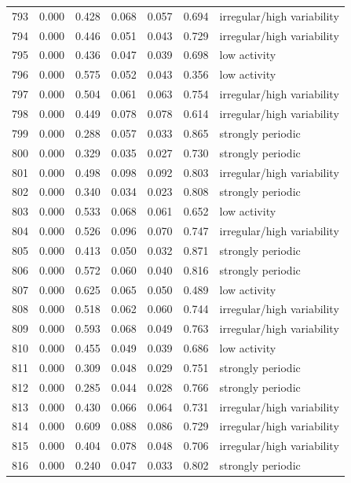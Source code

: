 \begin{longtable}{lrrrrrl}
793 & 0.000 & 0.428 & 0.068 & 0.057 & 0.694 & irregular/high variability \\
794 & 0.000 & 0.446 & 0.051 & 0.043 & 0.729 & irregular/high variability \\
795 & 0.000 & 0.436 & 0.047 & 0.039 & 0.698 & low activity \\
796 & 0.000 & 0.575 & 0.052 & 0.043 & 0.356 & low activity \\
797 & 0.000 & 0.504 & 0.061 & 0.063 & 0.754 & irregular/high variability \\
798 & 0.000 & 0.449 & 0.078 & 0.078 & 0.614 & irregular/high variability \\
799 & 0.000 & 0.288 & 0.057 & 0.033 & 0.865 & strongly periodic \\
800 & 0.000 & 0.329 & 0.035 & 0.027 & 0.730 & strongly periodic \\
801 & 0.000 & 0.498 & 0.098 & 0.092 & 0.803 & irregular/high variability \\
802 & 0.000 & 0.340 & 0.034 & 0.023 & 0.808 & strongly periodic \\
803 & 0.000 & 0.533 & 0.068 & 0.061 & 0.652 & low activity \\
804 & 0.000 & 0.526 & 0.096 & 0.070 & 0.747 & irregular/high variability \\
805 & 0.000 & 0.413 & 0.050 & 0.032 & 0.871 & strongly periodic \\
806 & 0.000 & 0.572 & 0.060 & 0.040 & 0.816 & strongly periodic \\
807 & 0.000 & 0.625 & 0.065 & 0.050 & 0.489 & low activity \\
808 & 0.000 & 0.518 & 0.062 & 0.060 & 0.744 & irregular/high variability \\
809 & 0.000 & 0.593 & 0.068 & 0.049 & 0.763 & irregular/high variability \\
810 & 0.000 & 0.455 & 0.049 & 0.039 & 0.686 & low activity \\
811 & 0.000 & 0.309 & 0.048 & 0.029 & 0.751 & strongly periodic \\
812 & 0.000 & 0.285 & 0.044 & 0.028 & 0.766 & strongly periodic \\
813 & 0.000 & 0.430 & 0.066 & 0.064 & 0.731 & irregular/high variability \\
814 & 0.000 & 0.609 & 0.088 & 0.086 & 0.729 & irregular/high variability \\
815 & 0.000 & 0.404 & 0.078 & 0.048 & 0.706 & irregular/high variability \\
816 & 0.000 & 0.240 & 0.047 & 0.033 & 0.802 & strongly periodic \\

\end{longtable}
